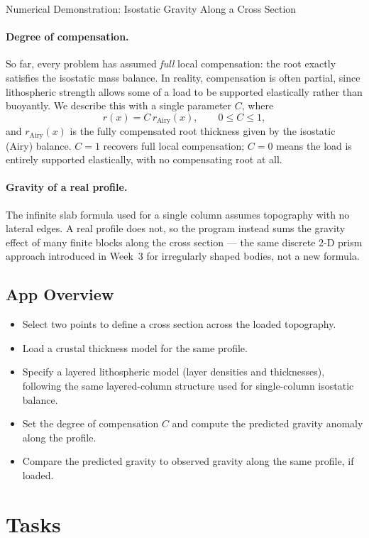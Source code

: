 \begin{activity}{Numerical Demonstration: Isostatic Gravity Along a Cross Section}
\paragraph{Degree of compensation.} So far, every problem has assumed \emph{full} local compensation: the root exactly satisfies the isostatic mass balance. In reality, compensation is often partial, since lithospheric strength allows some of a load to be supported elastically rather than buoyantly. We describe this with a single parameter $C$, where
\[
    r(x) = C\, r_{\mathrm{Airy}}(x), \qquad 0 \le C \le 1,
\]
and $r_{\mathrm{Airy}}(x)$ is the fully compensated root thickness given by the isostatic (Airy) balance. $C=1$ recovers full local compensation; $C=0$ means the load is entirely supported elastically, with no compensating root at all.

\paragraph{Gravity of a real profile.} The infinite slab formula used for a single column assumes topography with no lateral edges. A real profile does not, so the program instead sums the gravity effect of many finite blocks along the cross section --- the same discrete 2-D prism approach introduced in Week~3 for irregularly shaped bodies, not a new formula.

\subsection*{App Overview}

\begin{itemize}
    \item Select two points to define a cross section across the loaded topography.
    \item Load a crustal thickness model for the same profile.
    \item Specify a layered lithospheric model (layer densities and thicknesses), following the same layered-column structure used for single-column isostatic balance.
    \item Set the degree of compensation $C$ and compute the predicted gravity anomaly along the profile.
    \item Compare the predicted gravity to observed gravity along the same profile, if loaded.
\end{itemize}

\section*{Tasks}


\end{activity}
